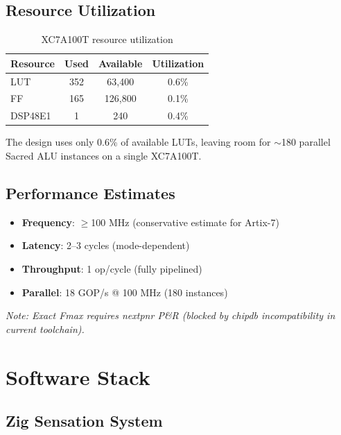 \documentclass[10pt,conference]{IEEEtran}
\begin{document}
\subsection{Resource Utilization}

\begin{table}[h]
  \centering
  \caption{XC7A100T resource utilization}
  \label{tab:utilization}
  \begin{tabular}{lccc}
    \toprule
    Resource & Used & Available & Utilization \\
    \midrule
    LUT & 352 & 63,400 & 0.6\% \\
    FF & 165 & 126,800 & 0.1\% \\
    DSP48E1 & 1 & 240 & 0.4\% \\
    \bottomrule
  \end{tabular}
\end{table}

The design uses only 0.6\% of available LUTs, leaving room for $\sim$180 parallel Sacred ALU instances on a single XC7A100T.

\subsection{Performance Estimates}

\begin{itemize}
  \item \textbf{Frequency}: $\ge$100 MHz (conservative estimate for Artix-7)
  \item \textbf{Latency}: 2--3 cycles (mode-dependent)
  \item \textbf{Throughput}: 1 op/cycle (fully pipelined)
  \item \textbf{Parallel}: 18 GOP/s @ 100 MHz (180 instances)
\end{itemize}

\noindent\textit{Note: Exact Fmax requires nextpnr P\&R (blocked by chipdb incompatibility in current toolchain).}


\section{Software Stack}

\subsection{Zig Sensation System}
\end{document}
